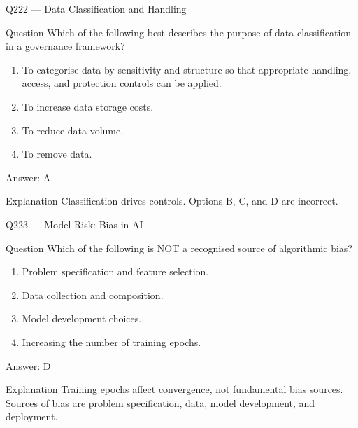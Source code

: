 \documentclass[aspectratio=169,8pt]{beamer}
\begin{document}
	
	\begin{frame}{Q222 --- Data Classification and Handling}
		\begin{block}{Question}
			Which of the following best describes the purpose of data classification in a governance framework?
			\begin{enumerate}
				\item To categorise data by sensitivity and structure so that appropriate handling, access, and protection controls can be applied.
				\item To increase data storage costs.
				\item To reduce data volume.
				\item To remove data.
			\end{enumerate}  \end{block}
			\begin{exampleblock}{Answer: A}\end{exampleblock}
			\begin{block}{Explanation}
				Classification drives controls. Options B, C, and D are incorrect.
			\end{block}
		\end{frame}
		
		\begin{frame}{Q223 --- Model Risk: Bias in AI}
			\begin{block}{Question}
				Which of the following is NOT a recognised source of algorithmic bias?
				\begin{enumerate}
					\item Problem specification and feature selection.
					\item Data collection and composition.
					\item Model development choices.
					\item Increasing the number of training epochs.
				\end{enumerate}  \end{block}
				\begin{exampleblock}{Answer: D}\end{exampleblock}
				\begin{block}{Explanation}
					Training epochs affect convergence, not fundamental bias sources. Sources of bias are problem specification, data, model development, and deployment.
				\end{block}
			\end{frame}
			
\end{document}
